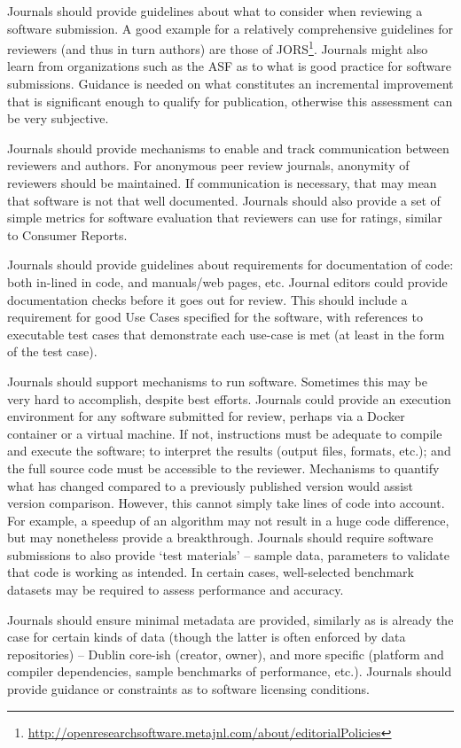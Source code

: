 \documentclass[11pt, oneside]{amsart}
\begin{document}
Journals should provide guidelines about what to consider when reviewing a
software submission. A good example for a relatively comprehensive guidelines
for reviewers (and thus in turn authors) are those of
JORS\footnote{\url{http://openresearchsoftware.metajnl.com/about/editorialPolicies}}.
Journals might also learn from organizations such as the ASF as to
what is good practice for software submissions. Guidance is needed on what
constitutes an incremental improvement that is significant enough to qualify for
publication, otherwise this assessment can be very subjective.

Journals should provide mechanisms to enable and track communication between
reviewers and authors. For anonymous peer review journals, anonymity of
reviewers should be maintained. If communication is necessary, that may mean that software is not
that well documented. Journals should also provide a set of simple metrics for
software evaluation that reviewers can use for ratings, similar to Consumer
Reports.

Journals should provide guidelines about requirements for documentation of code:
both in-lined in code, and manuals/web pages, etc. Journal editors could provide
documentation checks before it goes out for review. This should include a
requirement for good Use Cases specified for the software, with references to
executable test cases that demonstrate each use-case is met (at least in the
form of the test case).

Journals should support mechanisms to run software. Sometimes this may be very
hard to accomplish, despite best efforts. Journals could provide an execution
environment for any software submitted for review, perhaps via a Docker
container or a virtual machine. If not, instructions must be adequate to compile
and execute the software; to interpret the results (output files, formats,
etc.); and the full source code must be accessible to the reviewer. Mechanisms
to quantify what has changed compared to a previously published version would
assist version comparison. However, this cannot simply take lines of code into
account. For example, a speedup of an algorithm may not result in a huge code
difference, but may nonetheless provide a breakthrough. Journals should require
software submissions to also provide `test materials' -- sample data, parameters
to validate that code is working as intended. In certain cases, well-selected
benchmark datasets may be required to assess performance and accuracy.

Journals should ensure minimal metadata are provided, similarly as is already
the case for certain kinds of data (though the latter is often enforced by data
repositories) -- Dublin core-ish (creator, owner), and more specific (platform
and compiler dependencies, sample benchmarks of performance, etc.). Journals
should provide guidance or constraints as to software licensing conditions.
\end{document}
